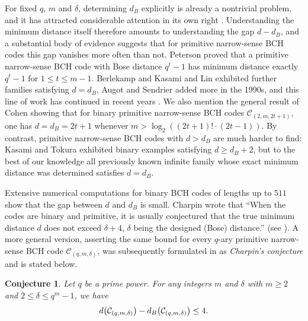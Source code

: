 \documentclass[journal,onecolumn]{IEEEtran}
\newtheorem*{conjecture}{Conjecture}
\begin{document}
For fixed $q$, $m$ and $\delta$, determining $d_B$ explicitly is already a
nontrivial problem, and it has attracted considerable attention in its own
right \cite{D2015,DFZ2017,YF2000,YH1996,zheng2025,zheng2026}. Understanding the minimum
distance itself therefore amounts to understanding the gap $d-d_B$, and a
substantial body of evidence suggests that for primitive narrow-sense BCH
codes this gap vanishes more often than not. Peterson \cite{Peterson1969}
proved that a primitive narrow-sense BCH code with Bose distance $q^t-1$ has
minimum distance exactly $q^t-1$ for $1\le t\le m-1$. Berlekamp
\cite{Berlekamp1970} and Kasami and Lin \cite{KasamiLin1972} exhibited further
families satisfying $d=d_B$, Augot and Sendrier \cite{AugotSendrier1994} added
more in the 1990s, and this line of work has continued in recent years
\cite{ChenEtAlBCH2026,ChenEtAlGoppaBCH2026,Li2017,NoguchiEtAl2021,
ShanyBerman2025,TiwariKewat2026}. We also mention the general result of Cohen \cite[Theorem 1.2]{MR1431812} showing that for binary primitive narrow-sense BCH codes $\mathcal{C}_{(2,m,2t+1)}$, one has $d=d_B=2t+1$ whenever $m >\log_2\left((2t+1)! \cdot (2t-1)\right)$. By contrast, primitive narrow-sense BCH
codes with $d>d_B$ are much harder to find: Kasami and Tokura
\cite{KT1969} exhibited binary examples satisfying $d\ge d_B+2$, but to the
best of our knowledge all previously known infinite family whose exact
minimum distance was determined satisfies $d=d_B$. 


Extensive numerical
computations for binary BCH codes of lengths up to $511$
\cite{AugotCharpinSendrier1992,CanteautChabaud1998} show that the gap between $d$ and $d_B$ is small. Charpin wrote that ``When the codes are binary and primitive, it is usually conjectured that the true minimum distance $d$ does not exceed $\delta+4$, $\delta$ being the designed (Bose)
distance.'' (see \cite[page 60]{Charpin1998}).
A more general version, asserting the same bound for every $q$-ary primitive narrow-sense BCH code $\mathcal{C}_{(q,m,\delta)}$, was subsequently formulated in
\cite{D2015,DFZ2017,Li2017} as \emph{Charpin's conjecture} and is stated below.
\begin{conjecture}
Let $q$ be a prime power. 
For any integers  $m$ and $\delta$ with 
$m\geq 2$ and $2\leq\delta\leq q^m-1$, we have
\begin{equation}\notag
d\bigl(\mathcal{C}_{(q,m,\delta)}\bigr)
-d_B\bigl(\mathcal{C}_{(q,m,\delta)}\bigr)
\leq 4.
\end{equation}
\end{conjecture}
\end{document}
